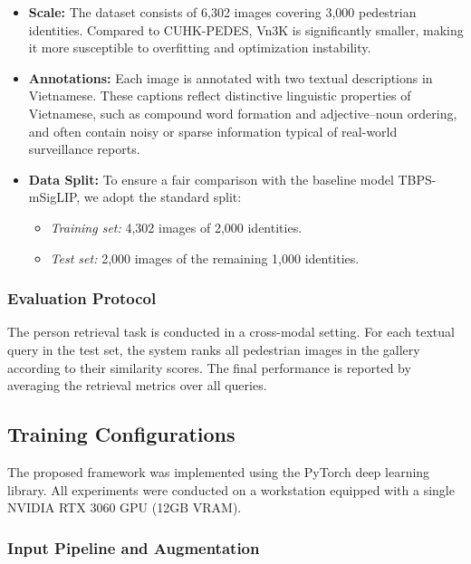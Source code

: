 \documentclass[../main.tex]{subfiles}
\begin{document}
\begin{itemize}
    \item \textbf{Scale:} The dataset consists of 6,302 images covering 3,000 pedestrian identities. Compared to CUHK-PEDES, Vn3K is significantly smaller, making it more susceptible to overfitting and optimization instability.
    
    \item \textbf{Annotations:} Each image is annotated with two textual descriptions in Vietnamese. These captions reflect distinctive linguistic properties of Vietnamese, such as compound word formation and adjective--noun ordering, and often contain noisy or sparse information typical of real-world surveillance reports.
    
    \item \textbf{Data Split:} To ensure a fair comparison with the baseline model TBPS-mSigLIP, we adopt the standard split:
    \begin{itemize}
        \item \textit{Training set:} 4,302 images of 2,000 identities.
        \item \textit{Test set:} 2,000 images of the remaining 1,000 identities.
    \end{itemize}
\end{itemize}

\subsubsection{Evaluation Protocol}

The person retrieval task is conducted in a cross-modal setting. For each textual query in the test set, the system ranks all pedestrian images in the gallery according to their similarity scores. The final performance is reported by averaging the retrieval metrics over all queries.

\subsection{Training Configurations}
The proposed framework was implemented using the PyTorch deep learning library. All experiments were conducted on a workstation equipped with a single NVIDIA RTX 3060 GPU (12GB VRAM).

\subsubsection{Input Pipeline and Augmentation}
\end{document}
